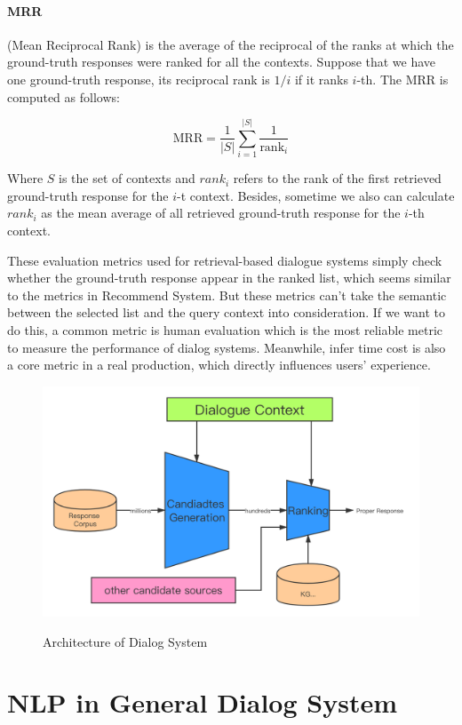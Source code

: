 \documentclass{article}
\begin{document}
\paragraph{MRR} (Mean Reciprocal Rank) is the average of the reciprocal of the ranks at which the ground-truth responses were ranked for all the contexts. Suppose that we have one ground-truth response, its reciprocal rank is $1/i$ if it ranks $i$-th. The MRR is computed as follows:

\begin{equation}
\mathrm{MRR}=\frac{1}{|S|} \sum_{i=1}^{|S|} \frac{1}{\operatorname{rank}_{i}}
\end{equation}

Where $S$ is the set of contexts and $rank_i$ refers to the rank of the first retrieved ground-truth response for the $i$-t context. Besides, sometime we also can calculate $rank_i$ as the mean average of all retrieved ground-truth response for the $i$-th context.

These evaluation metrics used for retrieval-based dialogue systems simply check whether the ground-truth response appear in the ranked list, which seems similar to the metrics in Recommend System. But these metrics can't take the semantic between the selected list and the query context into consideration. If we want to do this, a common metric is human evaluation which is the most reliable metric to measure the performance of dialog systems. Meanwhile, infer time cost is also a core metric in a real production, which directly influences users' experience.

\begin{figure}[htb]
\caption{Architecture of Dialog System}
	\centering
	\includegraphics[width=0.8\linewidth]{images/arch.png}
	\label{figure1}
\end{figure}

\section{NLP in General Dialog System}
\label{section3}
\end{document}
